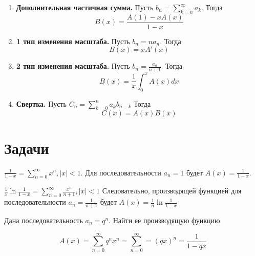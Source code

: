 \begin{enumerate}
    \item \textbf{Дополнительная частичная сумма.}
    Пусть $b_n = \sum_{k = n}^{\infty} a_k$. Тогда
    \begin{equation}
        \label{ext_partial_sum_p}
        B(x) = \frac{A(1) - xA(x)}{1-x}
    \end{equation}

    \item \textbf{1 тип изменения масштаба.}
    Пусть $b_n = na_n$. Тогда
    \begin{equation}
        \label{1_change_scale_p}
        B(x) = xA'(x)
    \end{equation}

    \item \textbf{2 тип изменения масштаба.}
    Пусть $b_n = \frac{a_n}{n + 1}$. Тогда
    \begin{equation}
        \label{2_change_scale_p}
        B(x) = \frac{1}{x}\int_0^x A(x)dx
    \end{equation}
    
    \item \textbf{Свертка.}
    Пусть $C_n = \sum_{k = 0}^{n} a_k b_{n - k}$ Тогда 
    \begin{equation}
        \label{conv_p}
        C(x) = A(x)B(x)
    \end{equation}
\end{enumerate}

\section{Задачи}
\begin{task}
    $\frac{1}{1 - x} = \sum_{n = 0}^{\infty} x^n, |x| < 1$. 
    Для последовательности $a_n = 1$ будет $A(x) = \frac{1}{1 - x}$.
\end{task}

\begin{task}
    $\frac{1}{x} \ln{\frac{1}{1 - x}} = \sum_{n = 0}^\infty \frac{x^n}{n + 1}, |x| < 1$
    Следовательно, производящей функцией для последовательности $a_n = \frac{1}{n + 1}$ будет
    $A(x) = \frac{1}{n}\ln{\frac{1}{1 - x}}$
\end{task}

\begin{task}
    Дана последовательность $a_n = q^n$. Найти ее производящую функцию.
    \begin{solution}
        \begin{equation*}
            A(x) = \sum_{n = 0}^{\infty} q^n x^n = \sum_{n = 0}^{\infty} = (qx)^n = \frac{1}{1 - qx}
        \end{equation*}
    \end{solution}
\end{task}

